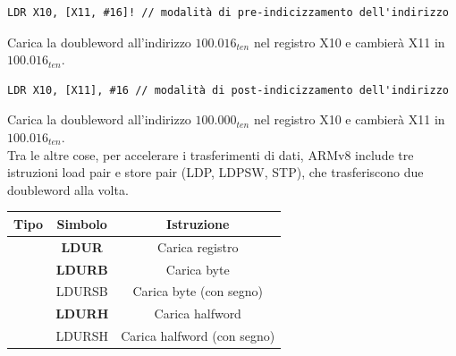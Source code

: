 \documentclass[12pt,a4paper]{article}
\begin{document}
\begin{verbatim}
LDR X10, [X11, #16]! // modalità di pre-indicizzamento dell'indirizzo
\end{verbatim}
Carica la doubleword all'indirizzo $100.016_{ten}$ nel registro X10 e cambierà X11 in $100.016_{ten}$.
\begin{verbatim}
LDR X10, [X11], #16 // modalità di post-indicizzamento dell'indirizzo
\end{verbatim}
Carica la doubleword all'indirizzo $100.000_{ten}$ nel registro X10 e cambierà X11 in $100.016_{ten}$.\\
Tra le altre cose, per accelerare i trasferimenti di dati, ARMv8 include tre istruzioni load pair e store pair (LDP, LDPSW, STP), che trasferiscono due doubleword alla volta.

\begin{center}
\begin{tabular}{|c|c|c|}
\hline
\rowcolor[HTML]{FFCB2F} 
Tipo                                                                                                         & Simbolo         & Istruzione                                                                                                \\ \hline
                                                                                                             & \textbf{LDUR}   & Carica registro                                                                                           \\ \cline{2-3} 
                                                                                                             & \textbf{LDURB}  & Carica byte                                                                                               \\ \cline{2-3} 
                                                                                                             & LDURSB          & Carica byte (con segno)                                                                                   \\ \cline{2-3} 
                                                                                                             & \textbf{LDURH}  & Carica halfword                                                                                           \\ \cline{2-3} 
                                                                                                             & LDURSH          & Carica halfword (con segno)                                                                               \\ \cline{2-3} 

\end{tabular}
\end{center}
\end{document}
